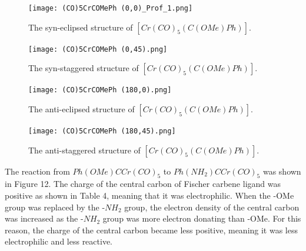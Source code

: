 \documentclass[twocolumn]{article} %
\begin{document}
\begin{figure}[h!]
      \centering
      \texttt{[image: (CO)5CrCOMePh (0,0)\_Prof\_1.png]} %
      \vspace{2mm} %
      \caption{The syn-eclipsed structure of $[Cr(CO)_5(C(OMe)Ph)]$.}
\end{figure}

\begin{figure}[h!]
      \centering
      \texttt{[image: (CO)5CrCOMePh (0,45).png]} %
      \vspace{2mm} %
      \caption{The syn-staggered structure of $[Cr(CO)_5(C(OMe)Ph)]$.}
\end{figure}

\begin{figure}[h!]
      \centering
      \texttt{[image: (CO)5CrCOMePh (180,0).png]} %
      \vspace{2mm} %
      \caption{The anti-eclipsed structure of $[Cr(CO)_5(C(OMe)Ph)]$.}
\end{figure}

\begin{figure}[h!]
      \centering
      \texttt{[image: (CO)5CrCOMePh (180,45).png]} %
      \vspace{2mm} %
      \caption{The anti-staggered structure of $[Cr(CO)_5(C(OMe)Ph)]$.}
\end{figure}

The reaction from $Ph(OMe)CCr(CO)_5$ to $Ph(NH_2)CCr(CO)_5$ was shown in Figure 12. The charge of the central carbon of Fischer carbene ligand was positive as shown in Table 4, meaning that it was electrophilic. When the -OMe group was replaced by the -$NH_2$ group, the electron density of the central carbon was increased as the -$NH_2$ group was more electron donating than -OMe. For this reason, the charge of the central carbon became less positive, meaning it was less electrophilic and less reactive.
\end{document}
